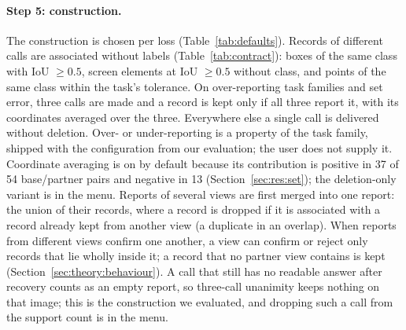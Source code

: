 \paragraph{Step 5: construction.} The construction is chosen per loss (Table~\ref{tab:defaults}). Records of different calls are associated without labels (Table~\ref{tab:contract}): boxes of the same class with IoU $\ge0.5$, screen elements at IoU $\ge0.5$ without class, and points of the same class within the task's tolerance. On over-reporting task families and set error, three calls are made and a record is kept only if all three report it, with its coordinates averaged over the three. Everywhere else a single call is delivered without deletion. Over- or under-reporting is a property of the task family, shipped with the configuration from our evaluation; the user does not supply it. Coordinate averaging is on by default because its contribution is positive in 37 of 54 base/partner pairs and negative in 13 (Section~\ref{sec:res:set}); the deletion-only variant is in the menu. Reports of several views are first merged into one report: the union of their records, where a record is dropped if it is associated with a record already kept from another view (a duplicate in an overlap). When reports from different views confirm one another, a view can confirm or reject only records that lie wholly inside it; a record that no partner view contains is kept (Section~\ref{sec:theory:behaviour}). A call that still has no readable answer after recovery counts as an empty report, so three-call unanimity keeps nothing on that image; this is the construction we evaluated, and dropping such a call from the support count is in the menu.


